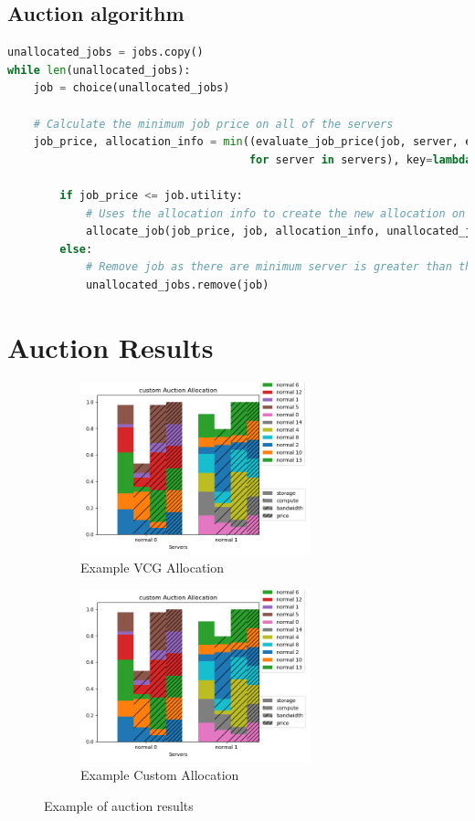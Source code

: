 \documentclass[fleqn]{article}
\begin{document}
\subsection{Auction algorithm}\label{subsec:auction-algorithm}
\begin{lstlisting}[language=Python]
unallocated_jobs = jobs.copy()
while len(unallocated_jobs):
    job = choice(unallocated_jobs)

    # Calculate the minimum job price on all of the servers
    job_price, allocation_info = min((evaluate_job_price(job, server, epsilon=epsilon)
                                     for server in servers), key=lambda bid: bid[0])

        if job_price <= job.utility:
            # Uses the allocation info to create the new allocation on the selected server
            allocate_job(job_price, job, allocation_info, unallocated_jobs)
        else:
            # Remove job as there are minimum server is greater than the job's utility
            unallocated_jobs.remove(job)
\end{lstlisting}
\section{Auction Results}\label{sec:auction-results}
\begin{figure}
    \begin{subfigure}{0.5\textwidth}
        \includegraphics[width=1\linewidth, height=5cm]{../results/vcg_auction.png}
        \caption{Example VCG Allocation}
    \end{subfigure}
    \begin{subfigure}{0.5\textwidth}
        \includegraphics[width=1\linewidth, height=5cm]{../results/custom_auction.png}
        \caption{Example Custom Allocation}
    \end{subfigure}
    \caption{Example of auction results}
\end{figure}
\end{document}
